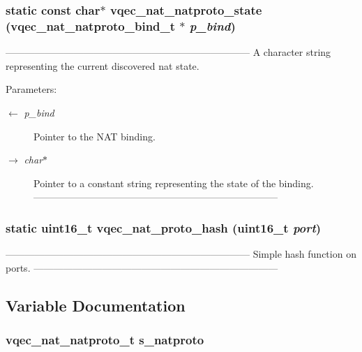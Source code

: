 \subsubsection{\setlength{\rightskip}{0pt plus 5cm}static const char$\ast$ vqec\_\-nat\_\-natproto\_\-state (\bf{vqec\_\-nat\_\-natproto\_\-bind\_\-t} $\ast$ {\em p\_\-bind})\hspace{0.3cm}{\tt  [static]}}\label{vqec__nat__natproto_8c_a820b8ec3fd9a3ee70bde1056465bb84}


--------------------------------------------------------------------------- A character string representing the current discovered nat state.

\begin{Desc}
\item[Parameters:]
\begin{description}
\item[\mbox{$\leftarrow$} {\em p\_\-bind}]Pointer to the NAT binding. \item[\mbox{$\rightarrow$} {\em char$\ast$}]Pointer to a constant string representing the state of the binding. --------------------------------------------------------------------------- \end{description}
\end{Desc}
\subsubsection{\setlength{\rightskip}{0pt plus 5cm}static uint16\_\-t vqec\_\-nat\_\-proto\_\-hash (uint16\_\-t {\em port})\hspace{0.3cm}{\tt  [inline, static]}}\label{vqec__nat__natproto_8c_ee1a38bea6b6959b04628df6c182209b}


--------------------------------------------------------------------------- Simple hash function on ports. --------------------------------------------------------------------------- 

\subsection{Variable Documentation}
\subsubsection{\setlength{\rightskip}{0pt plus 5cm}\bf{vqec\_\-nat\_\-natproto\_\-t} \bf{s\_\-natproto}\hspace{0.3cm}{\tt  [static]}}\label{vqec__nat__natproto_8c_01d1cc286c69d52038a9c8c9c8eb49d1}


